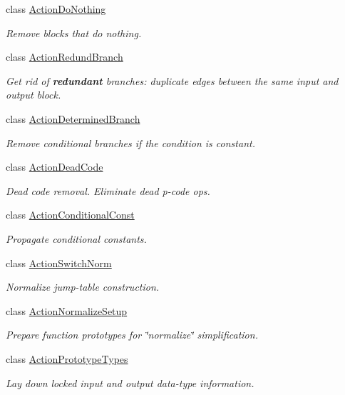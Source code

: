 \begin{DoxyCompactItemize}
class \mbox{\hyperlink{class_action_do_nothing}{Action\+Do\+Nothing}}
\begin{DoxyCompactList}\small\item\em Remove blocks that do nothing. \end{DoxyCompactList}\item 
class \mbox{\hyperlink{class_action_redund_branch}{Action\+Redund\+Branch}}
\begin{DoxyCompactList}\small\item\em Get rid of {\bfseries{redundant}} branches\+: duplicate edges between the same input and output block. \end{DoxyCompactList}\item 
class \mbox{\hyperlink{class_action_determined_branch}{Action\+Determined\+Branch}}
\begin{DoxyCompactList}\small\item\em Remove conditional branches if the condition is constant. \end{DoxyCompactList}\item 
class \mbox{\hyperlink{class_action_dead_code}{Action\+Dead\+Code}}
\begin{DoxyCompactList}\small\item\em Dead code removal. Eliminate {\itshape dead} p-\/code ops. \end{DoxyCompactList}\item 
class \mbox{\hyperlink{class_action_conditional_const}{Action\+Conditional\+Const}}
\begin{DoxyCompactList}\small\item\em Propagate conditional constants. \end{DoxyCompactList}\item 
class \mbox{\hyperlink{class_action_switch_norm}{Action\+Switch\+Norm}}
\begin{DoxyCompactList}\small\item\em Normalize jump-\/table construction. \end{DoxyCompactList}\item 
class \mbox{\hyperlink{class_action_normalize_setup}{Action\+Normalize\+Setup}}
\begin{DoxyCompactList}\small\item\em Prepare function prototypes for \char`\"{}normalize\char`\"{} simplification. \end{DoxyCompactList}\item 
class \mbox{\hyperlink{class_action_prototype_types}{Action\+Prototype\+Types}}
\begin{DoxyCompactList}\small\item\em Lay down locked input and output data-\/type information. \end{DoxyCompactList}\item 

\end{DoxyCompactItemize}
